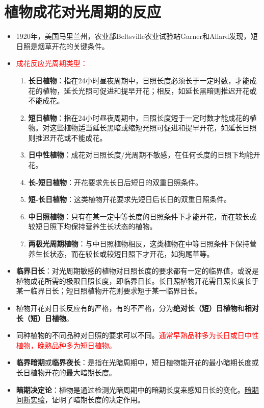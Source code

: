 \section{植物成花对光周期的反应}
\begin{itemize}
    \item 1920年，美国马里兰州，农业部Beltsville农业试验站Garner和Allard发现，短日照是烟草开花的关键条件。
    \item \textcolor{red}{成花反应光周期类型：}
    \begin{enumerate}
        \item \textbf{长日植物}：指在24小时昼夜周期中，日照长度必须长于一定时数，才能成花的植物，延长光照可促进和提早开花；相反，如延长黑暗则推迟开花或不能成花。
        \item \textbf{短日植物}：指在24小时昼夜周期中，日照长度短于一定时数才能成花的植物。对这些植物适当延长黑暗或缩短光照可促进和提早开花，如延长日照则推迟开花或不能成花。
        \item \textbf{日中性植物}：成花对日照长度/光周期不敏感，在任何长度的日照下均能开花。
        \item \textbf{长-短日植物}：开花要求先长日后短日的双重日照条件。
        \item \textbf{短-长日植物}：这类植物开花要求先短日后长日的双重日照条件。     
        \item \textbf{中日照植物}：只有在某一定中等长度的日照条件下才能开花，而在较长或较短日照下均保持营养生长状态的植物。
        \item \textbf{两极光周期植物}：与中日照植物相反，这类植物在中等日照条件下保持营养生长状态，而在较长或较短日照下才开花，如狗尾草等。
    \end{enumerate}
    \item \textbf{临界日长}：对光周期敏感的植物对日照长度的要求都有一定的临界值，或说是植物成花所需的极限日照长度，即临界日长。长日照植物开花需日照长度长于某一临界日长；短日照植物开花则要求短于某一临界日长。
    \item 植物开花对日长反应有的严格，有的不严格，分为\textbf{绝对长（短）日植物}和\textbf{相对长（短）日植物}。
    \item 同种植物的不同品种对日照的要求可以不同。\textcolor{red}{通常早熟品种多为长日或日中性植物，晚熟品种多为短日植物。}
    \item \textbf{临界暗期}或\textbf{临界夜长}：是指在光暗周期中，短日植物能开花的最小暗期长度或长日植物开花的最大暗期长度。
    \item \textbf{暗期决定论}：植物是通过检测光暗周期中的暗期长度来感知日长的变化。\uline{暗期间断实验}，证明了暗期长度的决定作用。 
\end{itemize}

